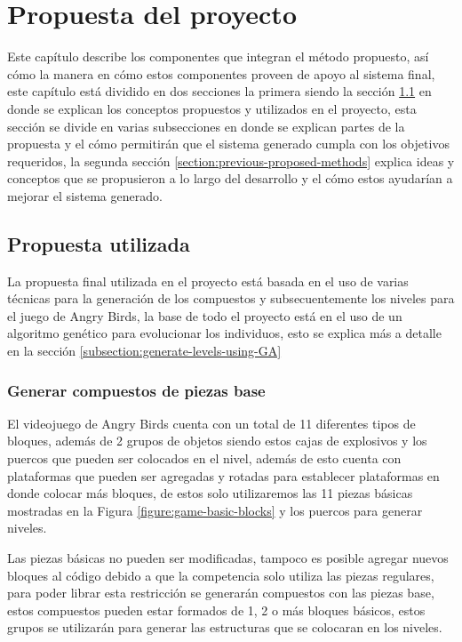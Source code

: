 \chapter{Propuesta del proyecto}
\label{chapter:proposed-method}

Este capítulo describe los componentes que integran el método propuesto, así
cómo la manera en cómo estos componentes proveen de apoyo al sistema final, este
capítulo está dividido en dos secciones la primera siendo la sección
\ref{section:used-method} en donde se explican los conceptos propuestos y
utilizados en el proyecto, esta sección se divide en varias subsecciones en
donde se explican partes de la propuesta y el cómo permitirán que el sistema
generado cumpla con los objetivos requeridos, la segunda sección
\ref{section:previous-proposed-methods} explica ideas y conceptos que se
propusieron a lo largo del desarrollo y el cómo estos ayudarían a mejorar el
sistema generado.

\section{Propuesta utilizada}
\label{section:used-method}

La propuesta final utilizada en el proyecto está basada en el uso de varias
técnicas para la generación de los compuestos y subsecuentemente los niveles
para el juego de Angry Birds, la base de todo el proyecto está en el uso de un
algoritmo genético para evolucionar los individuos, esto se explica más a
detalle en la sección \ref{subsection:generate-levels-using-GA}

\subsection{Generar compuestos de piezas base}
\label{subsection:generate-composites}

El videojuego de Angry Birds cuenta con un total de 11 diferentes tipos de
bloques, además de 2 grupos de objetos siendo estos cajas de explosivos y los
puercos que pueden ser colocados en el nivel, además de esto cuenta con
plataformas que pueden ser agregadas y rotadas para establecer plataformas en
donde colocar más bloques, de estos solo utilizaremos las 11 piezas básicas
mostradas en la Figura \ref{figure:game-basic-blocks} y los puercos para generar
niveles.

Las piezas básicas no pueden ser modificadas, tampoco es posible agregar nuevos
bloques al código debido a que la competencia solo utiliza las piezas regulares,
para poder librar esta restricción se generarán compuestos con las piezas base,
estos compuestos pueden estar formados de 1, 2 o más bloques básicos, estos
grupos se utilizarán para generar las estructuras que se colocaran en los niveles.

